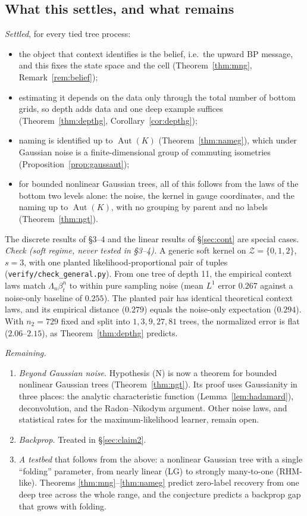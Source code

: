 \documentclass[11pt]{article}
\theoremstyle{definition}
\begin{document}
\subsection{What this settles, and what remains}
\emph{Settled}, for every tied tree process:
\begin{itemize}
\item the object that context identifies is the belief, i.e.\ the upward BP message, and this
fixes the state space and the cell (Theorem~\ref{thm:mng}, Remark~\ref{rem:belief});
\item estimating it depends on the data only through the total number of bottom grids, so
depth adds data and one deep example suffices (Theorem~\ref{thm:depthg},
Corollary~\ref{cor:depthg});
\item naming is identified up to $\operatorname{Aut}(K)$ (Theorem~\ref{thm:nameg}), which under
Gaussian noise is a finite-dimensional group of commuting isometries
(Proposition~\ref{prop:gaussaut});
\item for bounded nonlinear Gaussian trees, all of this follows from the laws of the bottom two
levels alone: the noise, the kernel in gauge coordinates, and the naming up to
$\operatorname{Aut}(K)$, with no grouping by parent and no labels (Theorem~\ref{thm:ngt}).
\end{itemize}
The discrete results of \S3--4 and the linear results of \S\ref{sec:cont} are special cases.
\emph{Check (soft regime, never tested in \S3--4).} A generic soft kernel on $\mathcal Z=\{0,1,2\}$,
$s=3$, with one planted likelihood-proportional pair of tuples (\texttt{verify/check\_general.py}).
From one tree of depth 11, the empirical context laws match $\Lambda_n\beta^n_t$ to within pure
sampling noise (mean $L^1$ error $0.267$ against a noise-only baseline of $0.255$). The planted
pair has identical theoretical context laws, and its empirical distance ($0.279$) equals the
noise-only expectation ($0.294$). With $n_2=729$ fixed and split into $1,3,9,27,81$ trees, the
normalized error is flat ($2.06$--$2.15$), as Theorem~\ref{thm:depthg} predicts.

\noindent\emph{Remaining.}
\begin{enumerate}
\item \emph{Beyond Gaussian noise.} Hypothesis (N) is now a theorem for bounded nonlinear Gaussian
trees (Theorem~\ref{thm:ngt}). Its proof uses Gaussianity in three places: the analytic
characteristic function (Lemma~\ref{lem:hadamard}), deconvolution, and the Radon--Nikodym argument.
Other noise laws, and statistical rates for the maximum-likelihood learner, remain open.
\item \emph{Backprop.} Treated in \S\ref{sec:claim2}.
\item \emph{A testbed} that follows from the above: a nonlinear Gaussian tree with a single
``folding'' parameter, from nearly linear (LG) to strongly many-to-one (RHM-like). Theorems
\ref{thm:mng}--\ref{thm:nameg} predict zero-label recovery from one deep tree across the whole
range, and the conjecture predicts a backprop gap that grows with folding.
\end{enumerate}
\end{document}
